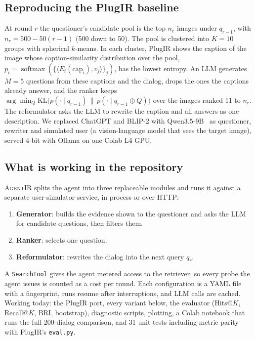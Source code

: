 \documentclass[sigconf,nonacm]{acmart}
\begin{document}
\subsection{Reproducing the PlugIR baseline}
At round $r$ the questioner's candidate pool is the top $n_r$ images under $q_{r-1}$, with
$n_r=500-50(r-1)$ (500 down to 50). The pool is clustered into $K=10$ groups with spherical
$k$-means. In each cluster, PlugIR shows the caption of the image whose caption-similarity
distribution over the pool,
$p_i=\operatorname{softmax}(\{\langle E_t(\text{cap}_i),v_j\rangle\}_j)$, has the lowest entropy.
An LLM generates $M=5$ questions from these captions and the dialog, drops the ones the captions
already answer, and the ranker keeps
$\arg\min_Q \mathrm{KL}\big(p(\cdot\mid q_{r-1})\,\|\,p(\cdot\mid q_{r-1}\oplus Q)\big)$ over the
images ranked 11 to $n_r$. The reformulator asks the LLM to rewrite the caption and all answers as
one description. We replaced ChatGPT and BLIP-2 with Qwen3.5-9B~\cite{qwen35} as questioner,
rewriter and simulated user (a vision-language model that sees the target image), served 4-bit with
Ollama on one Colab L4 GPU.

\subsection{What is working in the repository}
\textsc{AgentIR} splits the agent into three replaceable modules and runs it against a separate
user-simulator service, in process or over HTTP:
\begin{enumerate}
\item \textbf{Generator}: builds the evidence shown to the questioner and asks the LLM for
  candidate questions, then filters them.
\item \textbf{Ranker}: selects one question.
\item \textbf{Reformulator}: rewrites the dialog into the next query $q_r$.
\end{enumerate}
A \texttt{SearchTool} gives the agent metered access to the retriever, so every probe the agent
issues is counted as a cost per round. Each configuration is a YAML file with a fingerprint, runs
resume after interruptions, and LLM calls are cached. Working today: the PlugIR port, every variant
below, the evaluator (Hits@$K$, Recall@$K$, BRI, bootstrap), diagnostic scripts, plotting, a
Colab notebook that runs the full 200-dialog comparison, and 31 unit tests including metric parity
with PlugIR's \texttt{eval.py}.
\end{document}
